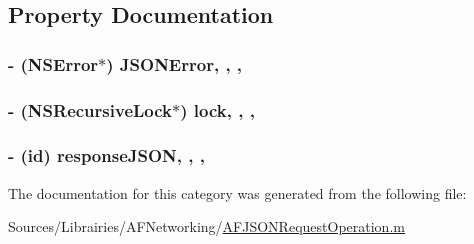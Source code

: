 \subsection{Property Documentation}
\hypertarget{category_a_f_j_s_o_n_request_operation_07_08_af84fedbcee459bee0491e551f017e9bd}{
\subsubsection[{J\-S\-O\-N\-Error}]{\setlength{\rightskip}{0pt plus 5cm}-\/ (N\-S\-Error$\ast$) J\-S\-O\-N\-Error\hspace{0.3cm}{\ttfamily [read]}, {\ttfamily [write]}, {\ttfamily [nonatomic]}, {\ttfamily [strong]}}}\label{category_a_f_j_s_o_n_request_operation_07_08_af84fedbcee459bee0491e551f017e9bd}
\hypertarget{category_a_f_j_s_o_n_request_operation_07_08_a9b544e1fd2dc7ec2d568ec09c12ec9ed}{
\subsubsection[{lock}]{\setlength{\rightskip}{0pt plus 5cm}-\/ (N\-S\-Recursive\-Lock$\ast$) lock\hspace{0.3cm}{\ttfamily [read]}, {\ttfamily [write]}, {\ttfamily [nonatomic]}, {\ttfamily [strong]}}}\label{category_a_f_j_s_o_n_request_operation_07_08_a9b544e1fd2dc7ec2d568ec09c12ec9ed}
\hypertarget{category_a_f_j_s_o_n_request_operation_07_08_a52b32f8f6a89688aed17411fe546b2ae}{
\subsubsection[{response\-J\-S\-O\-N}]{\setlength{\rightskip}{0pt plus 5cm}-\/ (id) response\-J\-S\-O\-N\hspace{0.3cm}{\ttfamily [read]}, {\ttfamily [write]}, {\ttfamily [nonatomic]}, {\ttfamily [strong]}}}\label{category_a_f_j_s_o_n_request_operation_07_08_a52b32f8f6a89688aed17411fe546b2ae}


The documentation for this category was generated from the following file\-:\begin{DoxyCompactItemize}
\item 
Sources/\-Librairies/\-A\-F\-Networking/\hyperlink{_a_f_j_s_o_n_request_operation_8m}{A\-F\-J\-S\-O\-N\-Request\-Operation.\-m}\end{DoxyCompactItemize}

